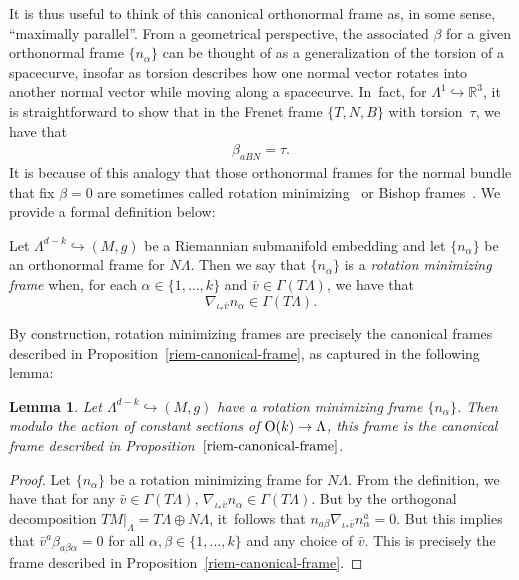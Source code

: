 \documentclass[pdftex]{sigma}
\numberwithin{equation}{section}
\newtheorem{Lemma}[Theorem]{Lemma}
\renewcommand{\=}{\stackrel \Lambda =}
\begin{document}
It is thus useful to think of this canonical orthonormal frame as, in some sense, ``maximally parallel''. From a geometrical perspective, the associated $\beta$ for a given orthonormal frame $\{n_{\alpha}\}$ can be thought of as a generalization of the torsion of a spacecurve, insofar as torsion describes how one normal vector rotates into another normal vector while moving along a spacecurve. In~fact, for $\Lambda^1 \hookrightarrow \mathbb{R}^3$, it is straightforward to show that in the Frenet frame $\{T, N, B\}$ with torsion~$\tau$, we have that
\begin{align*}%
\beta_{a B N} = \tau .
\end{align*}
It is because of this analogy that those orthonormal frames for the normal bundle that fix $\beta = 0$ are sometimes called rotation minimizing~\cite{RMFs} or Bishop frames~\cite{bishop}. We provide a formal definition below:
\begin{Definition}
Let $\Lambda^{d-k} \hookrightarrow (M,g)$ be a Riemannian submanifold embedding and let $\{n_{\alpha}\}$ be an orthonormal frame for $N \Lambda$. Then we say that $\{n_{\alpha}\}$ is a \textit{rotation minimizing frame} when, for each $\alpha \in \{1, \ldots, k\}$ and $\bar{v} \in \Gamma(T \Lambda)$, we have that
\[
\nabla_{\iota_* \bar{v}} n_{\alpha} \in \Gamma(T \Lambda) .
\]
\end{Definition}

By construction, rotation minimizing frames are precisely the canonical frames described in Proposition~\ref{riem-canonical-frame}, as captured in the following lemma:
\begin{Lemma} \label{rot-min-frame}
Let $\Lambda^{d-k} \hookrightarrow (M,g)$ have a rotation minimizing frame $\{n_\alpha\}$. Then modulo the action of constant sections of ${\rm O}(k) \rightarrow \Lambda$, this frame is the canonical frame described in Proposition~$\ref{riem-canonical-frame}$.
\end{Lemma}
\begin{proof}
Let $\{n_{\alpha}\}$ be a rotation minimizing frame for $N \Lambda$. From the definition, we have that for any $\bar{v} \in \Gamma(T \Lambda)$, $\nabla_{\iota_* \bar{v}} n_{\alpha} \in \Gamma(T \Lambda)$. But by the orthogonal decomposition $T M|_{\Lambda} = T \Lambda \oplus N \Lambda$, it~follows that $n_{a \beta} \nabla_{\iota_* \bar{v}} n^a_{\alpha} = 0$. But this implies that $\bar{v}^a \beta_{a \beta \alpha} = 0$ for all $\alpha,\beta \in \{1, \ldots, k\}$ and any choice of $\bar{v}$. This is precisely the frame described in Proposition~\ref{riem-canonical-frame}.
\end{proof}
\end{document}
